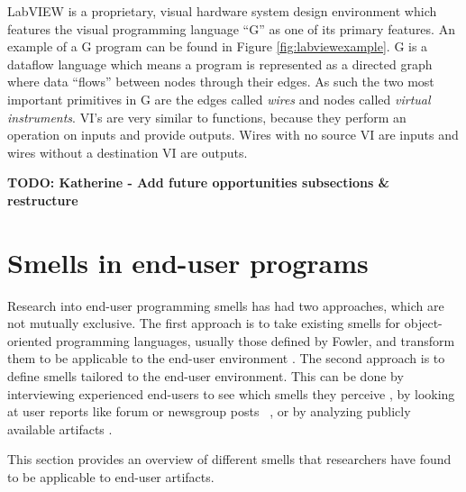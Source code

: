 \documentclass[10pt,conference,compsocconf]{IEEEtran}
\newcommand{\todo}[1]{\textbf{TODO: #1}}
\begin{document}
LabVIEW is a proprietary, visual hardware system design environment which features the visual programming language ``G'' as one of its primary features.
An example of a G program can be found in Figure \ref{fig:labviewexample}.
G is a dataflow language which means a program is represented as a directed graph where data ``flows'' between nodes through their edges.
As such the two most important primitives in G are the edges called \textit{wires} and nodes called \textit{virtual instruments}.
VI's are very similar to functions, because they perform an operation on inputs and provide outputs.
Wires with no source VI are inputs and wires without a destination VI are outputs. 


\todo{Katherine - Add future opportunities subsections \& restructure}

\section{Smells in end-user programs}
\label{sec:smells}
Research into end-user programming smells has had two approaches, which are not mutually exclusive.
The first approach is to take existing smells for object-oriented programming languages, usually those defined by Fowler, and transform them to be applicable to the end-user environment \cite{Hermans2012inter,Hermans2012intra,Stolee2011,StoleeTSE2013}.
The second approach is to define smells tailored to the end-user environment.
This can be done by interviewing experienced end-users to see which smells they perceive \cite{chambers2013smell}, by looking at user reports like forum or newsgroup posts~ \cite{badame2012refactoring,chambers2013smell}, or by analyzing publicly available artifacts \cite{Stolee2011,StoleeTSE2013}.

This section provides an overview of different smells that researchers have found to be applicable to end-user artifacts.
\end{document}
